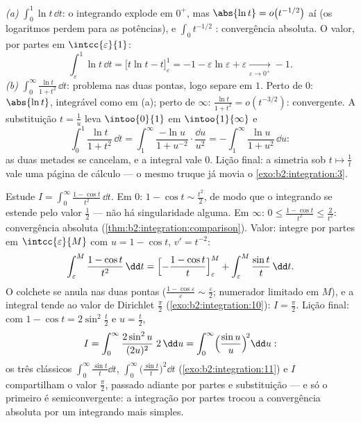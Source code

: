 \begin{example}\label{ex:b2:integration:warmups}
\emph{(a)} $\displaystyle\int_0^1 \ln t\,\dd t$: o integrando
explode em $0^+$, mas $\abs{\ln t} = o\bigl(t^{-1/2}\bigr)$
aí (os logaritmos perdem para as potências), e $\int_0 t^{-1/2}$
: convergência absoluta. O valor, por partes em
$\intcc{\varepsilon}{1}$:
\[
\int_\varepsilon^1 \ln t\,\dd t
= \bigl[t\ln t - t\bigr]_\varepsilon^1
= -1 - \varepsilon\ln\varepsilon + \varepsilon
\xrightarrow[\varepsilon\to0^+]{} -1 .
\]
\emph{(b)} $\displaystyle\int_0^\infty \frac{\ln t}{1 +
t^2}\,\dd t$: problema nas duas pontas, logo separe em $1$. Perto de $0$:
$\abs{\ln t}$, integrável como em (a); perto de $\infty$: $\frac{\ln
t}{1+t^2} = o(t^{-3/2})$:  convergente. A
substituição $t = \frac1u$ leva $\intoo{0}{1}$ em
$\intoo{1}{\infty}$ e
\[
\int_0^1 \frac{\ln t}{1+t^2}\,\dd t
= \int_1^{\infty} \frac{-\ln u}{1 + u^{-2}}\cdot
\frac{\dd u}{u^2}
= -\int_1^\infty \frac{\ln u}{1+u^2}\,\dd u :
\]
as duas metades se cancelam, e a integral vale $0$. Lição
final: a simetria sob $t \mapsto \frac1t$ vale uma página de
cálculo --- o mesmo truque já movia o
\cref{exo:b2:integration:3}.
\end{example}

\begin{example}\label{ex:b2:integration:onecos}
Estude $I = \displaystyle\int_0^{\infty} \frac{1 - \cos
t}{t^2}\,\dd t$. Em $0$: $1 - \cos t \sim \frac{t^2}2$, de modo que o
integrando se estende  pelo valor $\frac12$ --- não há
singularidade alguma. Em $\infty$: $0 \leq \frac{1 - \cos t}{t^2}
\leq \frac{2}{t^2}$: convergência absoluta
(\cref{thm:b2:integration:comparison}). Valor: integre por
partes em $\intcc{\varepsilon}{M}$ com $u = 1 - \cos t$, $v' =
t^{-2}$:
\[
\int_\varepsilon^M \frac{1 - \cos t}{t^2}\,\dd t
= \Bigl[-\frac{1 - \cos t}{t}\Bigr]_\varepsilon^M
+ \int_\varepsilon^M \frac{\sin t}{t}\,\dd t .
\]
O colchete se anula nas duas pontas ($\frac{1 -
\cos\varepsilon}{\varepsilon} \sim \frac\varepsilon2$; numerador
limitado em $M$), e a integral tende ao valor de Dirichlet
$\frac\pi2$ (\cref{exo:b2:integration:10}): $I = \frac\pi2$.
Lição final: com $1 - \cos t = 2\sin^2\frac t2$ e $u =
\frac t2$,
\[
I = \int_0^\infty \frac{2\sin^2 u}{(2u)^2}\;2\,\dd u
= \int_0^\infty \Bigl(\frac{\sin u}{u}\Bigr)^{\!2}\dd u :
\]
os três clássicos $\int_0^\infty\frac{\sin t}{t}\dd t$,
$\int_0^\infty\bigl(\frac{\sin t}{t}\bigr)^2\dd t$
(\cref{exo:b2:integration:11}) e $I$ compartilham o valor
$\frac\pi2$, passado adiante por partes e substituição --- e
só o primeiro é semiconvergente: a integração por partes trocou
a convergência absoluta por um integrando mais simples.
\end{example}

